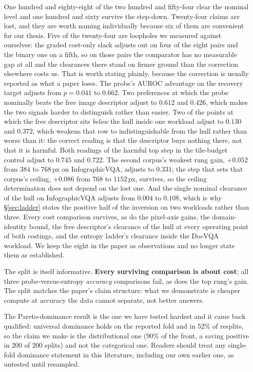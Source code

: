 \documentclass[10pt,twocolumn]{article}
\theoremstyle{plain}
\begin{document}
One hundred and eighty-eight of the two hundred and fifty-four clear the
nominal level and one hundred and sixty survive the step-down. Twenty-four claims
are lost, and they are worth naming individually because six of them are
convenient for our thesis. Five of the twenty-four are loopholes we measured
against ourselves: the graded cost-only slack adjusts out on four of the eight
pairs and the binary one on a fifth, so on those pairs the comparator has no
measurable gap at all and the clearances there stand on firmer ground than the
correction elsewhere costs us. That is worth stating plainly, because the
correction is usually reported as what a paper loses. The probe's AUROC advantage
on the recovery target adjusts from $p = 0.041$ to $0.662$. Two preferences at
which the probe nominally beats the free image descriptor adjust to $0.612$ and
$0.426$, which makes the two signals harder to distinguish rather than easier.
Two of the points at which the free descriptor sits \emph{below} the hull
inside one workload adjust to $0.130$ and $0.372$, which weakens that row to
indistinguishable from the hull rather than worse than it: the correct reading
is that the descriptor buys nothing there, not that it is harmful. Both readings of the harmful top step in the
tile-budget control adjust to $0.745$ and $0.722$. The second corpus's weakest
rung gain, $+0.052$ from $384$ to $768$\,px on InfographicVQA, adjusts to
$0.331$; the step that sets that corpus's ceiling, $+0.086$ from $768$ to
$1152$\,px, survives, so the ceiling determination does not depend on the lost
one. And the single nominal clearance of the hull on InfographicVQA adjusts
from $0.004$ to $0.108$, which is why \S\ref{sec:ladder} states the positive
half of the inversion on two workloads rather than three. Every cost comparison survives, as do the pixel-axis gains, the
domain-identity bound, the free descriptor's clearance of the hull at every
operating point of both costings, and the entropy ladder's clearance inside the
DocVQA workload. We keep the eight in the paper as observations and no longer
state them as established.

The split is itself informative. \textbf{Every surviving comparison is about
cost}; all three probe-versus-entropy \emph{accuracy} comparisons fail, as does
the top rung's gain. The split matches the paper's claim structure: what we
demonstrate is cheaper compute at accuracy the data cannot separate, not better
answers.

The Pareto-dominance result is the one we have tested hardest and it came back
qualified: universal dominance holds on the reported fold and in $52\%$ of
resplits, so the claim we make is the distributional one ($90\%$ of the front, a
saving positive in $200$ of $200$ splits) and not the categorical one. Readers
should treat any single-fold dominance statement in this literature, including
our own earlier one, as untested until resampled.
\end{document}
